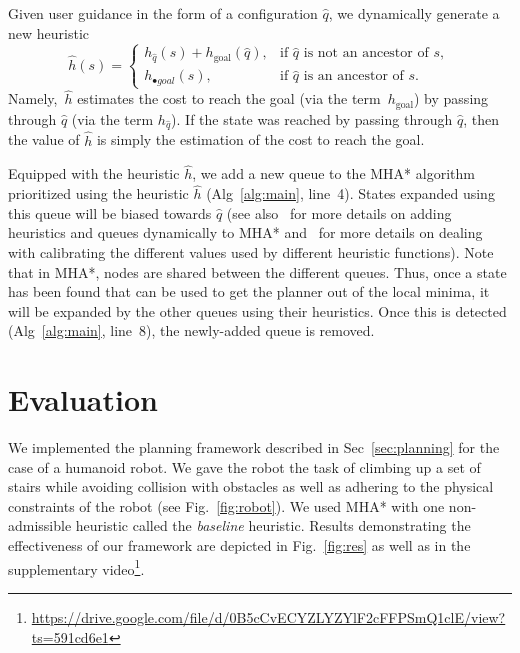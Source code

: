 \documentclass[conference]{IEEEtran}
\begin{document}
Given user guidance in the form of a configuration $\hat{q}$, we dynamically generate a new heuristic $$
    \hat{h}(s)= 
\begin{cases}
    h_{\hat{q}}(s) + h_{\text{goal}}(\hat{q}),	& 
    		\text{if } \hat{q} \text{ is not an ancestor of } s,\\
    h_{\textbf{•}{goal}}(s),            		& 
    		\text{if } \hat{q} \text{ is an ancestor of } s.
\end{cases}
$$
Namely,~$\hat{h}$ estimates the 
cost to reach the goal (via the term~$h_{\text{goal}}$) by passing through $\hat{q}$ (via the term $h_{\hat{q}}$). If the state was reached by passing through $\hat{q}$, then the value of $\hat{h}$ is simply the estimation of the cost to reach the goal.


Equipped with the heuristic $\hat{h}$, we add a new queue to the MHA* algorithm prioritized using the heuristic $\hat{h}$ (Alg~\ref{alg:main}, line~4). 
States expanded using this queue will be biased towards $\hat{q}$ (see also~\cite{INL15} for more details on adding heuristics and queues dynamically to MHA*
and~\cite{NAL15} for more details on dealing with calibrating the different values used by different heuristic functions).
Note that in MHA*, nodes are shared between the different queues.
Thus, once a state has been found that can be used to get the planner out of the local minima, it will be expanded by the other queues using their heuristics.
Once this is detected (Alg~\ref{alg:main}, line~8), the newly-added queue is removed.


\section{Evaluation }
\label{sec:eval}
We implemented the planning framework described in Sec~\ref{sec:planning} for the case of a humanoid robot. We gave the robot the task of climbing up a set of stairs while avoiding collision with obstacles as well as adhering to the physical constraints of the robot (see Fig.~\ref{fig:robot}).
We used MHA* with one non-admissible heuristic called the \emph{baseline} heuristic.
Results demonstrating the effectiveness of our framework are depicted in Fig.~\ref{fig:res}
as well as in the supplementary video\footnote{
\url{https://drive.google.com/file/d/0B5cCvECYZLYZYlF2cFFPSmQ1clE/view?ts=591cd6e1}}. 
\end{document}
